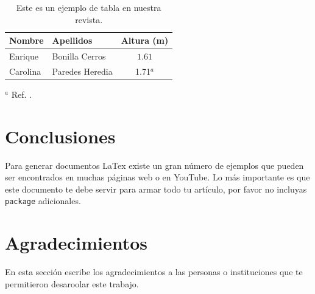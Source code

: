 \documentclass[9pt,twocolumn,twoside]{article} %
\begin{document}
\begin{table}[h]
\caption{Este es un ejemplo de tabla en nuestra revista.}
\label{tab:uno}
\begin{center}
\begin{tabular}{l|l|c}
\hline\hline
Nombre      &   Apellidos       &   Altura (m)\\
\hline
Enrique     &   Bonilla Cerros  &   $1.61$ \\
Carolina    &   Paredes Heredia &   1.71$^a$\\
\hline\hline
\end{tabular}
\end{center}
$^a$ Ref. \cite{1973_MEP_1}.
\end{table}

\section{Conclusiones}
Para generar documentos LaTex existe un gran número de ejemplos que pueden ser encontrados en muchas páginas web o en YouTube. Lo más importante es que este documento te debe servir para armar todo tu artículo, por favor no incluyas \texttt{package} adicionales.

\section*{Agradecimientos}
En esta sección escribe los agradecimientos a las personas o instituciones que te permitieron desaroolar este trabajo.



\end{document}
